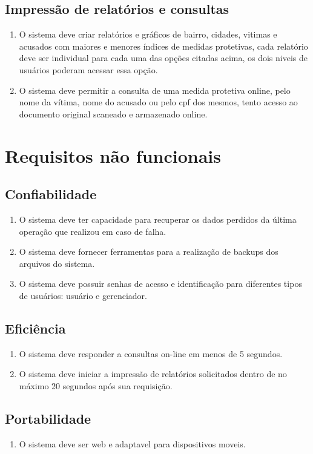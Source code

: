 \documentclass[
	12pt,				%
    oneside,			%
	a4paper,			%
	english,			%
	french,				%
	spanish,			%
	brazil,				%
	]{abntex2}
\begin{document}
\subsection{Impressão de relatórios e consultas}\label{RF3}
\begin{enumerate}
	\item O sistema deve criar relatórios e gráficos de bairro, cidades, vitimas e acusados com maiores e menores índices de medidas protetivas, cada relatório deve ser individual para cada uma das opções citadas acima, os dois niveis de usuários poderam acessar essa opção.
	\item O sistema deve permitir a consulta de uma medida protetiva online, pelo nome da vítima, nome do acusado ou pelo cpf dos mesmos, tento acesso ao documento original scaneado e armazenado online.
\end{enumerate}


\section{Requisitos não funcionais}

\subsection{Confiabilidade} \label{sec:RFN01}
\begin{enumerate}
	\item O sistema deve ter capacidade para recuperar os dados perdidos da última operação que realizou em caso de falha.
	\item O sistema deve fornecer ferramentas para a realização de backups dos arquivos do sistema.
	\item O sistema deve possuir senhas de acesso e identificação para diferentes tipos de usuários: usuário e gerenciador.
\end{enumerate}


\subsection{Eficiência}\label{sec:RFN02}
\begin{enumerate}
	\item O sistema deve responder a consultas on-line em menos de 5 segundos.
	\item O sistema deve iniciar a impressão de relatórios solicitados dentro de no máximo 20 segundos após sua requisição.
\end{enumerate}
\subsection{Portabilidade}\label{sec:RFN03}
\begin{enumerate}
	\item O sistema deve ser web e adaptavel para dispositivos moveis.
\end{enumerate}
\end{document}
